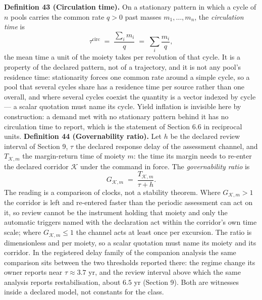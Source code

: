 \documentclass[11pt]{article}
\begin{document}
\textbf{Definition 43 (Circulation time).} On a stationary pattern in which a cycle of \(n\) pools carries the
common rate \(q > 0\) past masses \(m_1, \dots, m_n\), the \emph{circulation time} is
\[ \tau^{\mathrm{circ}} \;=\; \frac{\sum_i m_i}{q} \;=\; \sum_i \frac{m_i}{q} , \]
the mean time a unit of the moiety takes per revolution of that cycle. It is a property of the declared
pattern, not of a trajectory, and it is not any pool's residence time: stationarity forces one common rate
around a simple cycle, so a pool that several cycles share has a residence time per source rather than one
overall, and where several cycles coexist the quantity is a vector indexed by cycle --- a scalar quotation
must name its cycle. Yield inflation is invisible here by construction: a demand met with no stationary pattern behind it
has no circulation time to report, which is the statement of Section 6.6 in reciprocal units.
\textbf{Definition 44 (Governability ratio).} Let \(h\) be the declared review interval of Section 9, \(\tau\) the
declared response delay of the assessment channel, and \(T_{\mathcal{K},m}\) the margin-return time of moiety
\(m\): the time its margin needs to re-enter the declared corridor \(\mathcal K\) under the command in force.
The \emph{governability ratio} is
\[ G_{\mathcal{K},m} \;=\; \frac{T_{\mathcal{K},m}}{\tau + h} . \]
The reading is a comparison of clocks, not a stability theorem. Where \(G_{\mathcal{K},m} > 1\) the corridor is
left and re-entered faster than the periodic assessment can act on it, so review cannot be the instrument
holding that moiety and only the automatic triggers named with the declaration act within the corridor's own
time scale; where \(G_{\mathcal{K},m} \le 1\) the channel acts at least once per excursion. The ratio is
dimensionless and per moiety, so a scalar quotation must name its moiety and its corridor. In the registered
delay family of the companion analysis the same comparison sits between the two thresholds reported there: the
regime change its owner reports near \(\tau \approx 3.7\) yr, and the review interval above which the same
analysis reports restabilisation, about \(6.5\) yr (Section 9). Both are witnesses inside a declared model, not
constants for the class.
\end{document}
